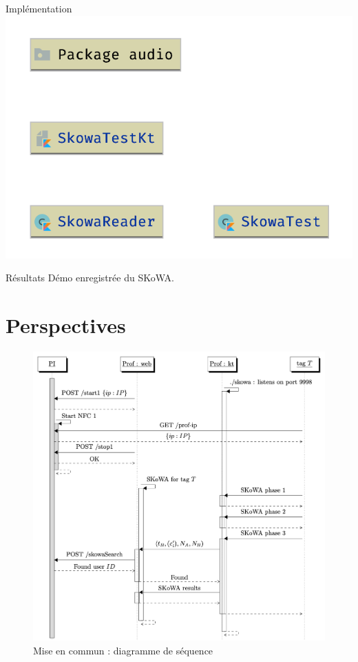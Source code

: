 \documentclass[aspectratio=169]{beamer}
\begin{document}
\begin{frame}{Implémentation}
  \centering
  \includegraphics[height=.9\textheight]{../assets/uml_skowa_reader}
\end{frame}

\begin{frame}{Résultats}
  Démo enregistrée du SKoWA.
\end{frame}

\section{Perspectives}

\begin{frame}
  \begin{figure}
    \centering
    \includegraphics[height=.9\textheight]{../assets/seq.png}
    \captionsetup{labelformat=empty}
    \caption{Mise en commun : diagramme de séquence}
  \end{figure}
\end{frame}
\end{document}
